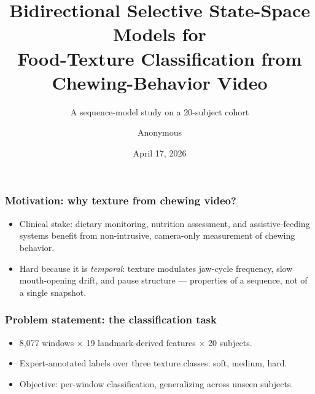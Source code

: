 \documentclass[aspectratio=169]{beamer}
\title{Bidirectional Selective State-Space Models for\\Food-Texture Classification from Chewing-Behavior Video}
\subtitle{A sequence-model study on a 20-subject cohort}
\author{Anonymous}
\institute{Anonymous Institution}
\date{April 17, 2026}
\begin{document}
\begin{frame}
  \titlepage
\end{frame}

\begin{frame}
  \frametitle{Motivation: why texture from chewing video?}
  \begin{itemize}
    \item Clinical stake: dietary monitoring, nutrition assessment, and assistive-feeding systems benefit from non-intrusive, camera-only measurement of chewing behavior.
    \item Hard because it is \emph{temporal}: texture modulates jaw-cycle frequency, slow mouth-opening drift, and pause structure --- properties of a sequence, not of a single snapshot.
  \end{itemize}
\end{frame}

\begin{frame}
  \frametitle{Problem statement: the classification task}
  \begin{itemize}
    \item 8{,}077 windows $\times$ 19 landmark-derived features $\times$ 20 subjects.
    \item Expert-annotated labels over three texture classes: soft, medium, hard.
    \item Objective: per-window classification, generalizing across unseen subjects.
  \end{itemize}
\end{frame}
\end{document}
